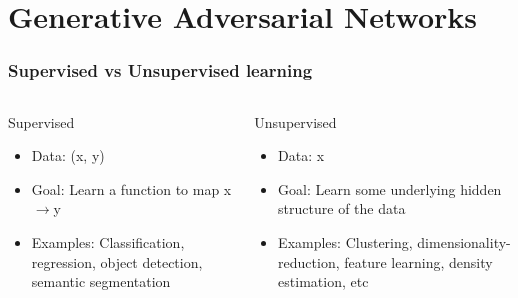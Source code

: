 \endgroup

\addtocounter{framenumber}{0}
\expandafter\def\expandafter\insertshorttitle\expandafter{%
	\insertshorttitle \hfill \insertframenumber\,/\,\inserttotalframenumber
}

\section[Plain GAN]{Generative Adversarial Networks}

\begin{frame}
\frametitle{Supervised vs Unsupervised learning}
\begin{columns}
	\begin{block}{Supervised}
		\begin{itemize}
			\item Data: (x, y)
			\item Goal: Learn a function to map x$\rightarrow$y
			\item Examples: Classification, regression, object detection, semantic segmentation
		\end{itemize}
	\end{block}
	\begin{block}{Unsupervised}
		\begin{itemize}
			\item Data: x
			\item Goal: Learn some underlying hidden structure of the data
			\item Examples:  Clustering, dimensionality-reduction, feature learning, density estimation, etc
		\end{itemize}
	\end{block}
\end{columns}
\end{frame}

